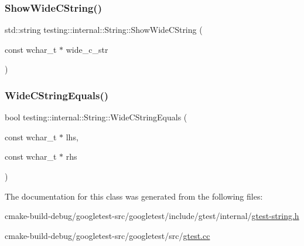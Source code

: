 \mbox{\label{classtesting_1_1internal_1_1String_aaf7e376ff580677ea4954d5913d5b917}} 
\subsubsection{\texorpdfstring{ShowWideCString()}{ShowWideCString()}}
{\footnotesize\ttfamily std\+::string testing\+::internal\+::\+String\+::\+Show\+Wide\+C\+String (\begin{DoxyParamCaption}\item[{const wchar\+\_\+t $\ast$}]{wide\+\_\+c\+\_\+str }\end{DoxyParamCaption})\hspace{0.3cm}{\ttfamily [static]}}

\mbox{\label{classtesting_1_1internal_1_1String_ab0373bf6e96453d6ca0de2e68df13d3a}} 
\subsubsection{\texorpdfstring{WideCStringEquals()}{WideCStringEquals()}}
{\footnotesize\ttfamily bool testing\+::internal\+::\+String\+::\+Wide\+C\+String\+Equals (\begin{DoxyParamCaption}\item[{const wchar\+\_\+t $\ast$}]{lhs,  }\item[{const wchar\+\_\+t $\ast$}]{rhs }\end{DoxyParamCaption})\hspace{0.3cm}{\ttfamily [static]}}



The documentation for this class was generated from the following files\+:\begin{DoxyCompactItemize}
\item 
cmake-\/build-\/debug/googletest-\/src/googletest/include/gtest/internal/\mbox{\hyperlink{gtest-string_8h}{gtest-\/string.\+h}}\item 
cmake-\/build-\/debug/googletest-\/src/googletest/src/\mbox{\hyperlink{gtest_8cc}{gtest.\+cc}}\end{DoxyCompactItemize}
